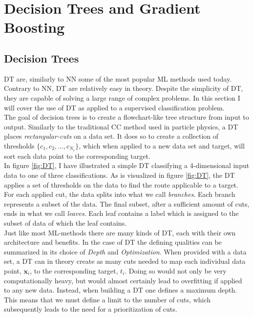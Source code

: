 \section{Decision Trees and Gradient Boosting}
\subsection{Decision Trees}
\acf{DT} are, similarly to \ac{NN} some of the most popular \ac{ML} methods used today.
Contrary to \ac{NN}, \ac{DT} are relatively easy in theory. Despite the simplicity of \ac{DT}, 
they are capable of solving a large range of complex problems. In this section I will cover the use 
of \ac{DT} as applied to a supervised classification problem.
\\
The goal of decision trees is to create a flowchart-like tree structure from input to output. 
Similarly to the traditional \ac{CC} method used in particle physics, a \ac{DT} 
places \emph{rectangular-cuts} on a data set. It does so to create a collection of thresholds 
$\{c_1, c_2,...,c_{N_c}\}$, which when applied to a new data set and target, 
will sort each data point to the corresponding target. 
\\
In figure \ref{fig:DT}, I have illustrated a simple \ac{DT} classifying a 4-dimensional 
input data to one of three classifications. As is visualized in figure \ref{fig:DT}, the \ac{DT} 
applies a set of thresholds on the data to find the route applicable to a target. For each applied 
cut, the data splits into what we call \emph{branches}. Each branch represents a subset of the data.
The final subset, after a sufficient amount of cuts, ends in what we call \emph{leaves}. Each leaf contains
a label which is assigned to the subset of data of which the leaf contains.
\\  
Just like most \ac{ML}-methods there are many kinds of \ac{DT}, each with their own 
architecture and benefits. In the case of \ac{DT} the defining qualities can be summarized in
its choice of \emph{Depth} and \emph{Optimization}. When provided with a data set,
a \ac{DT} can in theory create as many cuts needed to map each individual data point, $\textbf{x}_i$, to the 
corresponding target, $t_i$. Doing so would not only be very computationally heavy, but would almost 
certainly lead to overfitting if applied to any new data. Instead, when building a \ac{DT} one defines 
a maximum depth. This means that we must define a limit to the number of cuts, which 
subsequently leads to the need for a prioritization of cuts. 
\\
